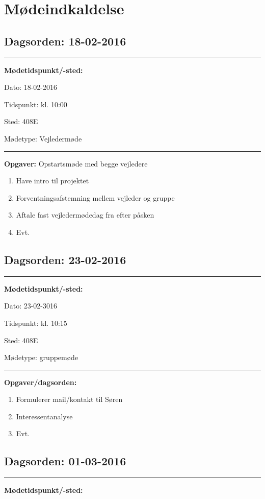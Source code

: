 \chapter{Mødeindkaldelse}

\section{Dagsorden: 18-02-2016 }
\hrule
\textbf{Mødetidspunkt/-sted:} 

Dato: \tabto{7em} 18-02-2016

Tidspunkt: \tabto{7em} kl. 10:00

Sted: \tabto{7em} 408E

Mødetype: \tabto{7em} Vejledermøde \newline


\hrule
\textbf{Opgaver:} \newline
Opstartsmøde med begge vejledere
\begin{enumerate}
\item Have intro til projektet
\item Forventningsafstemning mellem vejleder og gruppe 
\item Aftale fast vejledermødedag fra efter påsken
\item Evt. 
\end{enumerate}


\section{Dagsorden: 23-02-2016 }
\hrule
\textbf{Mødetidspunkt/-sted:} 

Dato: \tabto{7em} 23-02-3016

Tidspunkt: \tabto{7em} kl. 10:15

Sted: \tabto{7em} 408E

Mødetype: \tabto{7em} gruppemøde \newline


\hrule
\textbf{Opgaver/dagsorden:} \newline
\begin{enumerate}
	\item Formulerer mail/kontakt til Søren
	\item Interessentanalyse 
	\item Evt. 
\end{enumerate}


\section{Dagsorden: 01-03-2016 }
\hrule
\textbf{Mødetidspunkt/-sted:} 

